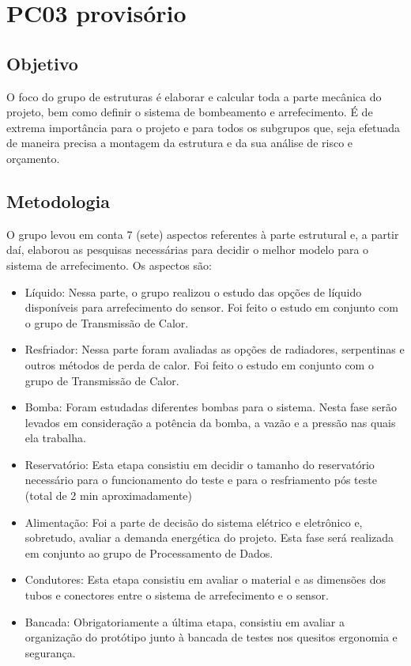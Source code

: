 \section{PC03 provisório}

\subsection{Objetivo}

O foco do grupo de estruturas é elaborar e calcular toda a parte mecânica do projeto, bem como definir o sistema de bombeamento e arrefecimento. É de extrema importância para o projeto e para todos os subgrupos que, seja efetuada de maneira precisa a montagem da estrutura e da sua análise de risco e orçamento.

\subsection{Metodologia}

O grupo levou em conta 7 (sete) aspectos referentes à parte estrutural e, a partir daí, elaborou as pesquisas necessárias para decidir o melhor modelo para o sistema de arrefecimento. Os aspectos são:

\begin{itemize}
\item	Líquido: Nessa parte, o grupo realizou o estudo das opções de líquido disponíveis para arrefecimento do sensor. Foi feito o estudo em conjunto com o grupo de Transmissão de Calor.
\item	Resfriador: Nessa parte foram avaliadas as opções de radiadores, serpentinas e outros métodos de perda de calor. Foi feito o estudo em conjunto com o grupo de Transmissão de Calor.
\item	Bomba: Foram estudadas diferentes bombas para o sistema. Nesta fase serão levados em consideração a potência da bomba, a vazão e a pressão nas quais ela trabalha.
\item Reservatório: Esta etapa consistiu em decidir o tamanho do reservatório necessário para o funcionamento do teste e para o resfriamento pós teste (total de 2 min aproximadamente)
\item	Alimentação: Foi a parte de decisão do sistema elétrico e eletrônico e, sobretudo, avaliar a demanda energética do projeto. Esta fase será realizada em conjunto ao grupo de Processamento de Dados.
\item	Condutores: Esta etapa consistiu em avaliar o material e as dimensões dos tubos e conectores entre o sistema de arrefecimento e o sensor.
\item	Bancada: Obrigatoriamente a última etapa, consistiu em avaliar a organização do protótipo junto à bancada de testes nos quesitos ergonomia e segurança.
\end{itemize}

